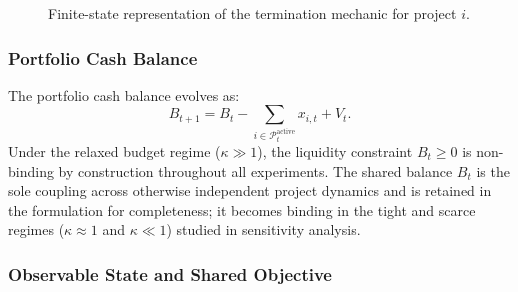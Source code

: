 \begin{figure}[htbp]
{%
  }
  \caption{Finite-state representation of the termination mechanic for
    project $i$.}
  \label{fig:state_machine}
\end{figure}

\subsubsection{Portfolio Cash Balance}
\label{subsubsec:balance}

The portfolio cash balance evolves as:
\begin{equation}
  B_{t+1}
    = B_t
      - \sum_{i \in \mathcal{P}_t^{\mathrm{active}}} x_{i,t}
      + V_t.
  \label{eq:balance}
\end{equation}
Under the relaxed budget regime ($\kappa \gg 1$), the liquidity
constraint $B_t \geq 0$ is non-binding by construction throughout
all experiments. The shared balance $B_t$ is the sole coupling
across otherwise independent project dynamics and is retained in
the formulation for completeness; it becomes binding in the tight
and scarce regimes ($\kappa \approx 1$ and $\kappa \ll 1$) studied
in sensitivity analysis.

\subsubsection{Observable State and Shared Objective}
\label{subsubsec:objective}

